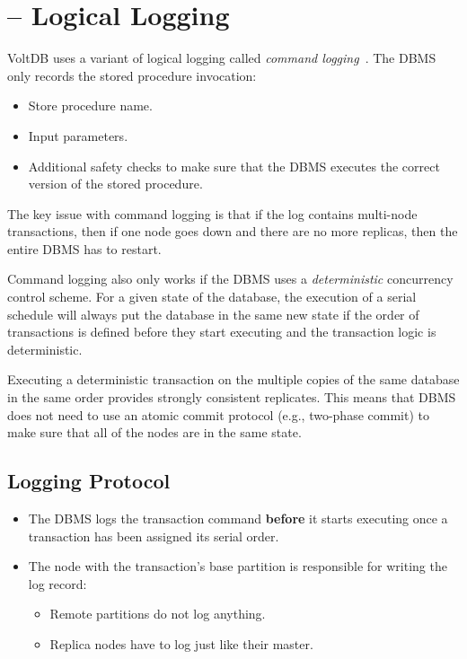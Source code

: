\documentclass[11pt]{article}
\begin{document}
\section{ -- Logical Logging}
VoltDB uses a variant of logical logging called \textit{command logging}~\cite{malviya-icde14}.
The DBMS only records the stored procedure invocation:
\begin{itemize}
    \item
    Store procedure name.
    
    \item
    Input parameters.
    
    \item
    Additional safety checks to make sure that the DBMS executes the correct version of the stored 
    procedure.
\end{itemize}
        
The key issue with command logging is that if the log contains multi-node transactions, then if one 
node goes down and there are no more replicas, then the entire DBMS has to restart.

Command logging also only works if the DBMS uses a \textit{deterministic} concurrency control 
scheme. For a given state of the database, the execution of a serial schedule will always put 
the database in the same new state if the order of transactions is defined before they start 
executing and the transaction logic is deterministic.

Executing a deterministic transaction on the multiple copies of the same database in the same order 
provides strongly consistent replicates. This means that DBMS does not need to use an atomic commit 
protocol (e.g., two-phase commit) to make sure that all of the nodes are in the same state.

\subsection{Logging Protocol}
\begin{itemize}
    \item
    The DBMS logs the transaction command \textbf{before} it starts executing once a transaction has 
    been assigned its serial order.
    
    \item The node with the transaction's base partition is responsible for writing the log record:
    \begin{itemize}
        \item
        Remote partitions do not log anything.
        
        \item
        Replica nodes have to log just like their master.
    \end{itemize}
\end{itemize}
\end{document}
